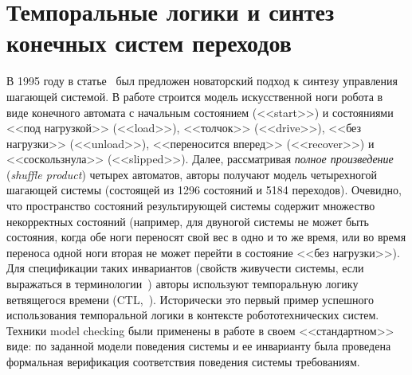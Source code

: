 \documentclass[a4, 14pt]{article}
\begin{document}
\section{Темпоральные логики и синтез конечных систем переходов}
\label{part:temporalLogics}
В 1995 году в статье~\cite{antoniotti1995discrete} был предложен новаторский 
подход к синтезу управления шагающей системой. В работе строится модель 
искусственной ноги робота в виде конечного автомата с начальным состоянием 
(<<start>>) и состояниями <<под нагрузкой>> (<<load>>), <<толчок>> (<<drive>>), 
<<без нагрузки>> (<<unload>>), <<переносится вперед>> (<<recover>>) и 
<<соскользнула>> (<<slipped>>). Далее, рассматривая \textit{полное произведение} 
(\textit{shuffle product}) четырех автоматов, авторы получают модель четырехногой шагающей 
системы (состоящей из 1296 состояний и 5184 переходов). Очевидно, что пространство 
состояний результирующей системы содержит множество некорректных состояний 
(например, для двуногой системы не может быть состояния, когда обе ноги переносят 
свой вес в одно и то же время, или во время переноса одной ноги вторая не может 
перейти в состояние <<без нагрузки>>). Для спецификации таких инвариантов 
(свойств живучести системы, если выражаться в терминологии~\cite{alpern1985defining}) 
авторы используют темпоральную логику ветвящегося времени (CTL,~\cite{clarke1986automatic}). 
Исторически это первый пример успешного использования темпоральной логики в 
контексте робототехнических систем. Техники model checking были применены в 
работе в своем <<стандартном>> виде: по заданной модели поведения системы и ее 
инварианту была проведена формальная верификация соответствия поведения системы 
требованиям.
\end{document}

